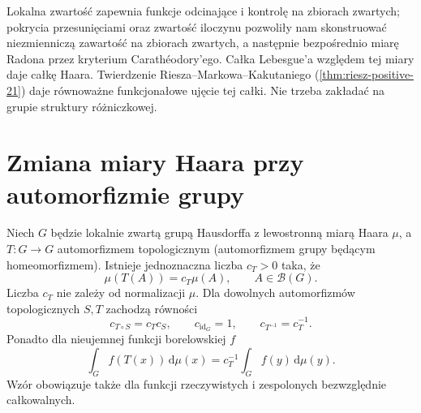 Lokalna zwartość zapewnia funkcje odcinające i kontrolę
na zbiorach zwartych; pokrycia przesunięciami oraz
zwartość iloczynu pozwoliły nam skonstruować
niezmienniczą zawartość na zbiorach zwartych,
a następnie bezpośrednio miarę Radona przez
kryterium Carathéodory'ego.
Całka Lebesgue'a względem tej miary daje całkę Haara.
Twierdzenie Riesza--Markowa--Kakutaniego
(\ref{thm:riesz-positive-21}) daje równoważne
funkcjonałowe ujęcie tej całki. Nie trzeba zakładać
na grupie struktury różniczkowej.

\section{Zmiana miary Haara przy automorfizmie grupy}
\begin{twierdzenie}
\label{tw:haar-automorfizm}
Niech $G$ będzie lokalnie zwartą grupą Hausdorffa
z lewostronną miarą Haara $\mu$, a $T:G\to G$
automorfizmem topologicznym (automorfizmem grupy
będącym homeomorfizmem).
Istnieje jednoznaczna liczba $c_T>0$ taka, że
\[
 \mu(T(A))=c_T\mu(A),\qquad A\in\mathcal B(G).
\]
Liczba $c_T$ nie zależy od normalizacji $\mu$.
Dla dowolnych automorfizmów topologicznych $S,T$
zachodzą równości
\[
 c_{T\circ S}=c_Tc_S,\qquad c_{\operatorname{id}_G}=1,
 \qquad c_{T^{-1}}=c_T^{-1}.
\]
Ponadto dla nieujemnej funkcji borelowskiej $f$
\begin{equation}\label{it:eq:haar-automorphism-integral}
 \int_G f(T(x))\,\mathrm d\mu(x)
 =c_T^{-1}\int_G f(y)\,\mathrm d\mu(y).
\end{equation}
Wzór obowiązuje także dla funkcji rzeczywistych
i zespolonych bezwzględnie całkowalnych.
\end{twierdzenie}
